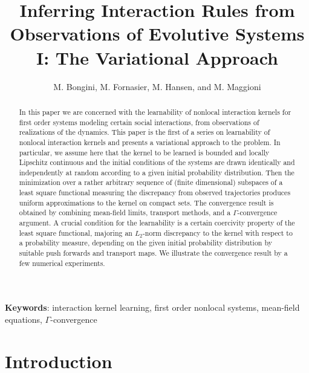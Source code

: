 \documentclass[A4paper,11pt]{article}
\title{Inferring Interaction Rules from Observations of Evolutive Systems I: The Variational Approach}
\author{M. Bongini, M. Fornasier, M. Hansen, and M. Maggioni}
\date{}
\theoremstyle{definition}
\begin{document}
\maketitle

\begin{abstract}
In this paper we are concerned with the  learnability of nonlocal interaction kernels for  first order systems modeling certain social interactions, from observations of realizations of the dynamics. This paper is the first  of a series  on learnability of nonlocal interaction kernels and presents a variational approach to the problem. In particular, we assume here that the kernel to be learned is bounded and locally Lipschitz continuous and the initial conditions of the systems are drawn identically and independently at random according to a given initial probability distribution. Then the minimization over a rather arbitrary  sequence of (finite dimensional) subspaces of a least square functional measuring the discrepancy from observed trajectories  produces uniform approximations to the kernel on compact sets. The convergence result is obtained by combining mean-field limits, transport methods, and a $\Gamma$-convergence argument. A crucial condition for the learnability is a certain coercivity property of the least square functional, majoring an $L_2$-norm discrepancy to the kernel with respect to a probability measure, depending on the given initial probability distribution by suitable push forwards and transport maps. We illustrate the convergence result by a few numerical experiments. 
\end{abstract}
{\bf Keywords}: interaction kernel learning, first order nonlocal systems, mean-field equations, $\Gamma$-convergence

\bigskip

\section{Introduction}
\end{document}
